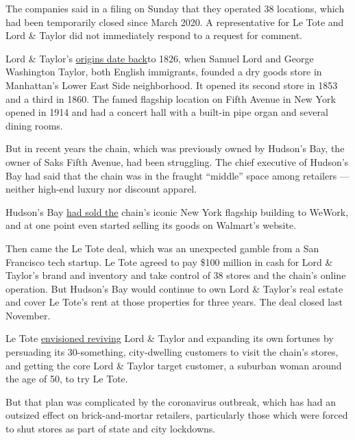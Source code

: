 The companies said in a filing on Sunday that they operated 38
locations, which had been temporarily closed since March 2020. A
representative for Le Tote and Lord \& Taylor did not immediately
respond to a request for comment.

Lord \& Taylor's
\href{http://www.hbcheritage.ca/history/acquisitions/lord-and-taylor-historical-timeline}{origins
date back}to 1826, when Samuel Lord and George Washington Taylor, both
English immigrants, founded a dry goods store in Manhattan's Lower East
Side neighborhood. It opened its second store in 1853 and a third in
1860. The famed flagship location on Fifth Avenue in New York opened in
1914 and had a concert hall with a built-in pipe organ and several
dining rooms.

But in recent years the chain, which was previously owned by Hudson's
Bay, the owner of Saks Fifth Avenue, had been struggling. The chief
executive of Hudson's Bay had said that the chain was in the fraught
``middle'' space among retailers --- neither high-end luxury nor
discount apparel.

Hudson's Bay
\href{https://www.nytimes3xbfgragh.onion/2017/10/24/business/lord-taylor-wework.html}{had
sold the} chain's iconic New York flagship building to WeWork, and at
one point even started selling its goods on Walmart's website.

Then came the Le Tote deal, which was an unexpected gamble from a San
Francisco tech startup. Le Tote agreed to pay \$100 million in cash for
Lord \& Taylor's brand and inventory and take control of 38 stores and
the chain's online operation. But Hudson's Bay would continue to own
Lord \& Taylor's real estate and cover Le Tote's rent at those
properties for three years. The deal closed last November.

Le Tote
\href{https://www.nytimes3xbfgragh.onion/2019/12/11/style/lord-taylor-return-pop-up-le-tote.html}{envisioned
reviving} Lord \& Taylor and expanding its own fortunes by persuading
its 30-something, city-dwelling customers to visit the chain's stores,
and getting the core Lord \& Taylor target customer, a suburban woman
around the age of 50, to try Le Tote.

But that plan was complicated by the coronavirus outbreak, which has had
an outsized effect on brick-and-mortar retailers, particularly those
which were forced to shut stores as part of state and city lockdowns.

